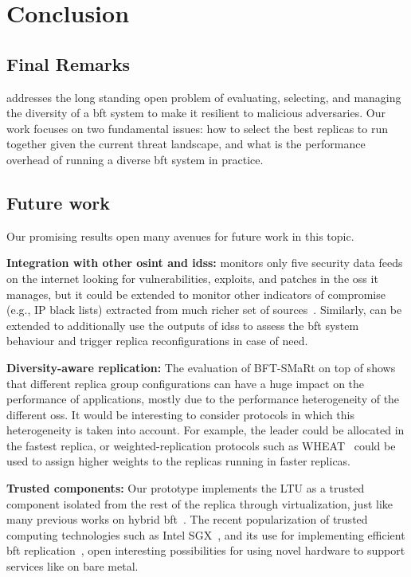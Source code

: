 \chapter{Conclusion}
\label{chap:conclusion}

\section{Final Remarks}
\system addresses the long standing open problem of evaluating, selecting, and managing the diversity of a \gls{bft} system to make it resilient to malicious adversaries.
Our work focuses on two fundamental issues: how to select the best replicas to run together given the current threat landscape, and what is the performance overhead of running a diverse \gls{bft} system in practice.

\section{Future work}
Our promising results open many avenues for future work in this topic.

\textbf{Integration with other \gls{osint} and \glspl{ids}:}
\system monitors only five security data feeds on the internet looking for vulnerabilities, exploits, and patches in the \glspl{os} it manages, but it could be extended to monitor other indicators of compromise (e.g., IP black lists) extracted from much richer set of sources~\cite{Liao:2016,Sabottke:2015}.
Similarly, \system can be extended to additionally use the outputs of \glspl{ids} to assess the \gls{bft} system behaviour and trigger replica reconfigurations in case of need.

\textbf{Diversity-aware replication:}
The evaluation of BFT-SMaRt on top of \system shows that different replica group configurations can have a huge impact on the performance of applications, mostly due to the performance heterogeneity of the different \glspl{os}.
It would be interesting to consider protocols in which this heterogeneity is taken into account.
For example, the leader could be allocated in the fastest replica, or weighted-replication protocols such as WHEAT~\cite{Sousa:2015} could be used to assign higher weights to the replicas running in faster replicas.


\textbf{Trusted components:}
Our prototype implements the LTU as a trusted component isolated from the rest of the replica through virtualization, just like many previous works on hybrid \gls{bft}~\cite{Veronese:2013,Roeder:2010,Platania:2014,Sousa:2010,Distler:2011}.
The recent popularization of trusted computing technologies such as Intel SGX~\cite{sgx}, and its use for implementing efficient \gls{bft} replication~\cite{Behl:2017}, open interesting possibilities for using novel hardware to support services like \system on bare metal.
